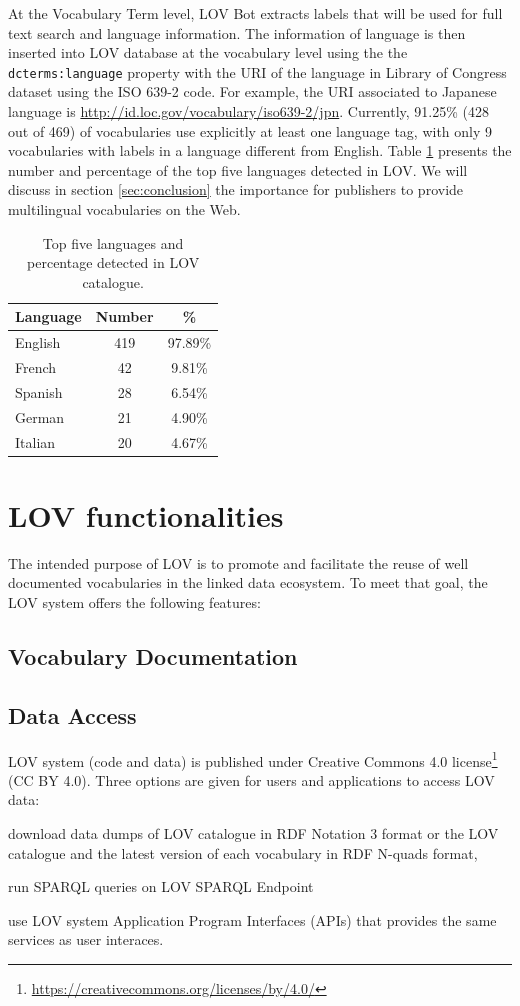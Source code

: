 \documentclass{iosart2c}
\begin{document}
At the Vocabulary Term level, LOV Bot extracts labels that will be used for full text search and language information. The information of language is then inserted into LOV database at the vocabulary level using the the \texttt{dcterms:language} property with the URI of the language in Library of Congress dataset using the ISO 639-2 code. For example, the URI associated to Japanese language is \url{http://id.loc.gov/vocabulary/iso639-2/jpn}. Currently, 91.25\% (428 out of 469) of vocabularies use explicitly at least one language tag, with only 9 vocabularies with labels in a language different from English. Table \ref{tab:language} presents the number and percentage of the top five languages detected in LOV. We will discuss in section \ref{sec:conclusion} the importance for publishers to provide multilingual vocabularies on the Web.
 
 \begin{table}[h!tb]
\caption{Top five languages and percentage detected in LOV catalogue.}
\begin{tabular}{lcc}
\hline
\textbf{Language} & \textbf{Number} & \textbf{\%}  \\ \hline
English  & 419   &  97.89\%      \\
French & 42 & 9.81\% \\
Spanish & 28 & 6.54\%\\
German & 21 & 4.90\%\\
Italian & 20 & 4.67\%\\
\hline  
\end{tabular}
\label{tab:language}
\end{table}

\section{LOV functionalities}
\label{sec:about}

The intended purpose of LOV is to promote and facilitate the reuse of well documented vocabularies in the linked data ecosystem. To meet that goal, the LOV system offers the following features:

	\subsection{Vocabulary Documentation}
	\subsection{Data Access}
	LOV system (code and data) is published under Creative Commons 4.0 license\footnote{\url{https://creativecommons.org/licenses/by/4.0/}} (CC BY 4.0). Three options are 		given for users and applications to access LOV data:
		\begin{inparaenum}[1)] 
			\item download data dumps of LOV catalogue in RDF Notation 3 format or the LOV catalogue and the latest version of each vocabulary in RDF N-quads format,
			\item run SPARQL queries on LOV SPARQL Endpoint
			\item use LOV system Application Program Interfaces (APIs) that provides the same services as user interaces.
		\end{inparaenum}
\end{document}
